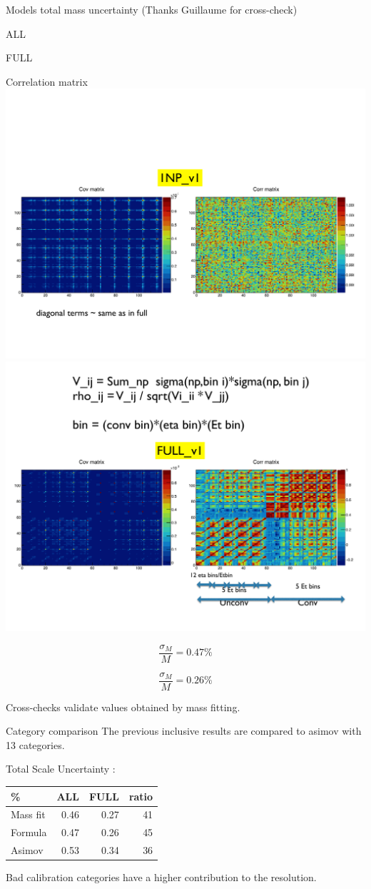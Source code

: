\documentclass[a4paper]{beamer}
\begin{document}
\begin{frame}{Models total mass uncertainty}
  (Thanks Guillaume for cross-check)
  
  \centering
  \begin{minipage}{0.49\linewidth}\centering ALL \end{minipage}
  \hfill
  \begin{minipage}{0.49\linewidth}\centering FULL \end{minipage}

  Correlation matrix\\
  \includegraphics[width=0.49\linewidth]{plots/170109_Unal_mh_syst_corrALL.pdf}
  \hfill
  \includegraphics[width=0.49\linewidth]{plots/170109_Unal_mh_syst_corrFULL.pdf}

  
  \begin{minipage}{0.49\linewidth} $$\frac{\sigma_M}{M}=0.47\%$$\end{minipage}
  \hfill
  \begin{minipage}{0.49\linewidth}$$\frac{\sigma_M}{M}=0.26\%$$ \end{minipage}

  \vfill
  Cross-checks validate values obtained by mass fitting.
  \end{frame}
  \begin{frame}{Category comparison}
    The previous inclusive results are compared to asimov with 13 categories.

    \begin{center}
      Total Scale Uncertainty :\\
      \begin{tabular}{l|rrr}
        \% & ALL & FULL & ratio\\
        \hline
        Mass fit & 0.46 & 0.27 & 41\\
        Formula & 0.47 & 0.26 & 45\\
        Asimov & 0.53 & 0.34 & 36\\
      \end{tabular}
    \end{center}

    Bad calibration categories have a higher contribution to the resolution.
  \end{frame}
\end{document}
